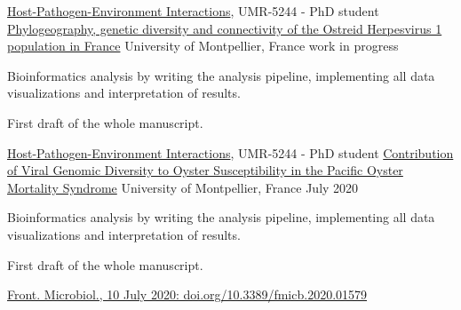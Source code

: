 

\begin{cventries}

  \cventry
    {\href{http://ihpe.univ-perp.fr/en/}{Host-Pathogen-Environment Interactions}, UMR-5244 - PhD student} %
    {\href{}{Phylogeography, genetic diversity and connectivity of the Ostreid Herpesvirus 1 population in France}} %
    {University of Montpellier, France} %
    {work in progress} %
    {
      \begin{cvitems} %
        \item {Bioinformatics analysis by writing the analysis pipeline, implementing all data visualizations and interpretation of results.}
        \item {First draft of the whole manuscript.}
      \end{cvitems}
    }

  \cventry
    {\href{http://ihpe.univ-perp.fr/en/}{Host-Pathogen-Environment Interactions}, UMR-5244 - PhD student} %
    {\href{https://doi.org/10.3389/fmicb.2020.01579}{Contribution of Viral Genomic Diversity to Oyster Susceptibility in the Pacific Oyster Mortality Syndrome}} %
    {University of Montpellier, France} %
    {July 2020} %
    {
      \begin{cvitems} %
        \item {Bioinformatics analysis by writing the analysis pipeline, implementing all data visualizations and interpretation of results.}
        \item {First draft of the whole manuscript.}
        \item {\href{https://doi.org/10.3389/fmicb.2020.01579}{Front. Microbiol., 10 July 2020: doi.org/10.3389/fmicb.2020.01579}}
      \end{cvitems}
    }


\end{cventries}
